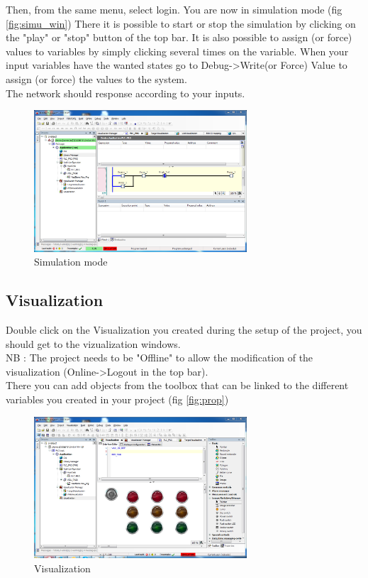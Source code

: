 \documentclass[10pt,a4paper]{article}
\begin{document}
Then, from the same menu, select login. You are now in simulation mode (fig \vref{fig:simu_win})
There it is possible to start or stop the simulation by clicking on the "play" or "stop" button of the top bar.
It is also possible to assign (or force) values to variables by simply clicking several times on the variable. When your input variables have the wanted states go to Debug->Write(or Force) Value to assign (or force) the values to the system.\\
The network should response according to your inputs.

\begin{figure}[h!]
	\begin{center}
		\includegraphics[width=300px]{img10.PNG}
	\end{center}
\caption{Simulation mode}
\label{fig:simu_win}
\end{figure}

\subsection{Visualization}

Double click on the Visualization you created during the setup of the project, you should get to the vizualization windows.\\
NB : The project needs to be "Offline" to allow the modification of the visualization (Online->Logout in the top bar).\\
There you can add objects from the toolbox that can be linked to the different variables you created in your project (fig \vref{fig:prop})

\begin{figure}[h!]
	\begin{center}
		\includegraphics[width=300px]{img11.PNG}
	\end{center}
\caption{Visualization}
\label{fig:visu}
\end{figure}
\end{document}
